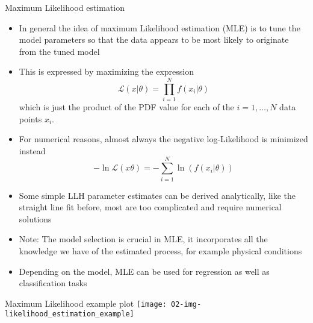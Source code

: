   \begin{frame}{Maximum Likelihood estimation}
    \begin{itemize}
      \item In general the idea of maximum Likelihood estimation (MLE) is to tune the model parameters so that the data appears to be most likely to originate from the tuned model
      \item This is expressed by maximizing the expression
        \begin{equation*}
          \mathcal{L}(x|\theta) = \prod_{i=1}^N f(x_i | \theta)
        \end{equation*}
        which is just the product of the PDF value for each of the $i=1, \dots, N$ data points $x_i$.
      \item For numerical reasons, almost always the negative log-Likelihood is minimized instead
      \begin{equation}
        -\ln\mathcal{L}(x\theta) = -\sum_{i=1}^N \ln(f(x_i | \theta))
      \end{equation}
      \item Some simple LLH parameter estimates can be derived analytically, like the straight line fit before, most are too complicated and require numerical solutions
      \item Note: The model selection is crucial in MLE, it incorporates all the knowledge we have of the estimated process, for example physical conditions
      \item Depending on the model, MLE can be used for regression as well as classification tasks
    \end{itemize}
  \end{frame}

  \begin{frame}{Maximum Likelihood example plot}
    \texttt{[image: 02-img-likelihood\_estimation\_example]}
  \end{frame}


